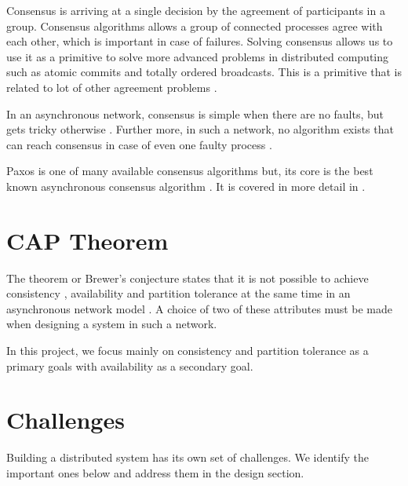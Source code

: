 Consensus is arriving at a single decision by the agreement of participants in a
group. Consensus algorithms allows a group of connected processes agree with 
each other, which is important in case of failures. Solving consensus allows
us to use it as a primitive to solve more advanced problems in distributed
computing such as atomic commits and totally ordered broadcasts. This is a
primitive that is related to lot of other agreement problems \citep{GS01}.

In an asynchronous network, consensus is simple when there are no faults, but
gets tricky otherwise \citep{Lampson:1996:HBH}. Further more, in such a network,
no algorithm exists that can reach consensus in case of even one faulty process
\citep{FisLynPat85}.

Paxos is one of many available consensus algorithms but, its core is the best
known asynchronous consensus algorithm \citep{Lampson:1996:HBH}. It is covered
in more detail in .

\section{CAP Theorem}

The  theorem or Brewer's conjecture states that it is not 
possible to achieve consistency%
, availability%
and partition tolerance%
at the same time in an asynchronous network model
\citep{journals/sigact/GilbertL02}. A choice of two of these attributes must
be made when designing a system in such a network.

In this project, we focus mainly on consistency and partition tolerance 
as a primary goals with availability as a secondary goal.

\section{Challenges}

Building a distributed system has its own set of challenges. We identify the
important ones below and address them in the design section.


